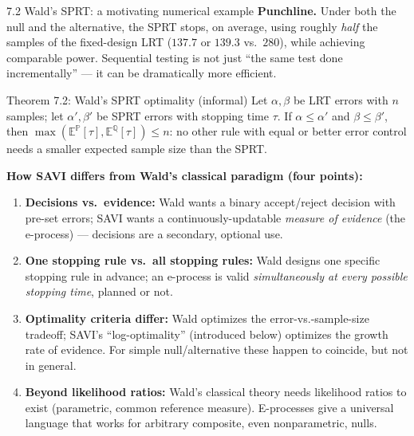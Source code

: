 \documentclass[aspectratio=169,10pt]{beamer}
\begin{document}
\begin{frame}[allowframebreaks]{7.2 Wald's SPRT: a motivating numerical example}
\textbf{Punchline.} Under both the null and the alternative, the SPRT stops, on average, using roughly \emph{half}
the samples of the fixed-design LRT ($137.7$ or $139.3$ vs.\ $280$), while achieving comparable power. Sequential
testing is not just ``the same test done incrementally'' --- it can be dramatically more efficient.

\begin{block}{Theorem 7.2: Wald's SPRT optimality (informal)}
Let $\alpha,\beta$ be LRT errors with $n$ samples; let $\alpha',\beta'$ be SPRT errors with stopping time $\tau$.
If $\alpha \le \alpha'$ and $\beta \le \beta'$, then $\max(\mathbb{E}^{\mathbb P}[\tau], \mathbb{E}^{\mathbb Q}[\tau]) \le n$:
no other rule with equal or better error control needs a smaller expected sample size than the SPRT.
\end{block}

\framebreak

\textbf{How SAVI differs from Wald's classical paradigm (four points):}
\begin{enumerate}
\item \textbf{Decisions vs.\ evidence:} Wald wants a binary accept/reject decision with pre-set errors; SAVI wants
a continuously-updatable \emph{measure of evidence} (the e-process) --- decisions are a secondary, optional use.
\item \textbf{One stopping rule vs.\ all stopping rules:} Wald designs one specific stopping rule in advance; an
e-process is valid \emph{simultaneously at every possible stopping time}, planned or not.
\item \textbf{Optimality criteria differ:} Wald optimizes the error-vs.-sample-size tradeoff; SAVI's ``log-optimality''
(introduced below) optimizes the growth rate of evidence. For simple null/alternative these happen to coincide, but
not in general.
\item \textbf{Beyond likelihood ratios:} Wald's classical theory needs likelihood ratios to exist (parametric,
common reference measure). E-processes give a universal language that works for arbitrary composite, even
nonparametric, nulls.
\end{enumerate}

\end{frame}
\end{document}
